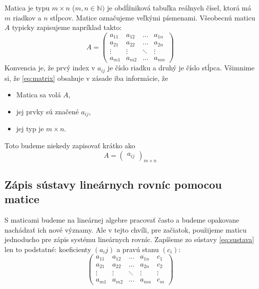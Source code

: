 Matica je typu $m\times n$ ($m,n\in\mathbb N)$ je obdĺžniková tabuľka reálnych čísel,
ktorá má $m$ riadkov a $n$ stĺpcov. Matice označujeme veľkými písmenami.
Všeobecnú maticu $A$ typicky zapisujeme napríklad takto:
\begin{equation}\label{eq:matrix}
A=
\left(
\begin{array}{cccc}
    a_{11} & a_{12} & \dots & a_{1n} \\
    a_{21} & a_{22} & \dots & a_{2n} \\
    \vdots & \vdots & \ddots & \vdots \\
    a_{m1} & a_{m2} & \dots & a_{mn}
\end{array}
\right)
\end{equation}
Konvencia je, že prvý index v $a_{ij}$ je číslo riadku a  
druhý je číslo stĺpca. Všimnime si, že \eqref{eq:matrix} obsahuje v zásade iba
informácie, že
\begin{itemize}
\item Matica sa volá $A$,
\item jej prvky sú značené $a_{ij}$,
\item jej typ je $m\times n$.
\end{itemize}
Toto budeme niekedy zapisovať krátko ako
\[
A=
\left(
\begin{array}{c}
a_{ij}
\end{array}
\right)_{m\times n}
\]


\subsection{Zápis sústavy lineárnych rovníc pomocou matice}

S maticami budeme na lineárnej algebre
pracovať často a budeme opakovane nachádzať ich nové významy. 
Ale v tejto chvíli, pre začiatok, použijeme maticu jednoducho pre zápis systému
lineárnych rovníc. Zapíšeme zo sústavy \eqref{eq:sustava} len to podstatné: koeficienty $(a_ij)$ a
pravú stanu $(c_i)$:
\[
\left( \begin{array}{cccc|c} a_{11} & a_{12} & \dots & a_{1n} & c_{1} \\ a_{21} & a_{22} & \dots & a_{2n} & c_{2} \\ \vdots & \vdots & \ddots & \vdots & \vdots \\ a_{m1} & a_{m2} & \dots & a_{mn} & c_{m} \end{array} \right)
\]

